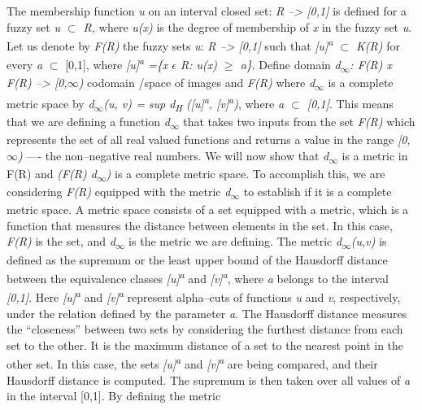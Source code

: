 \documentclass[12pt,a4paper]{report}
\numberwithin{equation}{section}
\begin{document}
The membership function \emph{u} on an interval closed set: \emph{R
--\textgreater{} {[}0,1{]}} is defined for a fuzzy set \emph{u $\subset$ R,}
where \emph{u(x)} is the degree of membership of \emph{x} in the fuzzy
set \emph{u}. Let us denote by \emph{F(R)} the fuzzy sets \emph{u}:
\emph{R --\textgreater{} {[}0,1{]}} such that
\emph{{[}u{]}\textsuperscript{a} $\subset$ K(R)} for every \emph{a} $\subset$ {[}0,1{]},
where \emph{{[}u{]}\textsuperscript{a} =\{x $\epsilon$ R: u(x) $\geq$ a\}}. Define
domain \emph{d\textsubscript{$\infty$}: F(R) x F(R) --\textgreater{} {[}0,$\infty$)}
codomain /space of images and \emph{F(R)} where
\emph{d\textsubscript{$\infty$}} is a complete metric space by
\emph{d\textsubscript{$\infty$}(u, v) = sup d\textsubscript{H}
({[}u{]}\textsuperscript{a}, {[}v{]}\textsuperscript{a})}, where \emph{a
$\subset$ {[}0,1{]}}. This means that we are defining a function
\emph{d\textsubscript{$\infty$}} that takes two inputs from the set \emph{F(R)}
which represents the set of all real valued functions and returns a
value in the range \emph{{[}0, $\infty$)} ---- the non--negative real numbers. We
will now show that \emph{d\textsubscript{$\infty$}} is a metric in F(R) and
\emph{(F(R) d\textsubscript{$\infty$})} is a complete metric space. To
accomplish this, we are considering \emph{F(R)} equipped with the metric
\emph{d\textsubscript{$\infty$}} to establish if it is a complete metric space.
A metric space consists of a set equipped with a metric, which is a
function that measures the distance between elements in the set. In this
case, \emph{F(R)} is the set, and \emph{d\textsubscript{$\infty$}} is the
metric we are defining. The metric \emph{d\textsubscript{$\infty$}(u,v)} is
defined as the supremum or the least upper bound of the Hausdorff
distance between the equivalence classes
\emph{{[}u{]}\textsuperscript{a}} and \emph{{[}v{]}\textsuperscript{a}},
where \emph{a} belongs to the interval \emph{{[}0,1{]}}. Here
\emph{{[}u{]}\textsuperscript{a}} and \emph{{[}v{]}\textsuperscript{a}}
represent alpha--cuts of functions \emph{u} and
\emph{v}, respectively, under the relation defined by the parameter
\emph{a}. The Hausdorff distance measures the ``closeness'' between two
sets by considering the furthest distance from each set to the other. It
is the maximum distance of a set to the nearest point in the other set.
In this case, the sets \emph{{[}u{]}\textsuperscript{a}} and
\emph{{[}v{]}\textsuperscript{a}} are being compared, and their
Hausdorff distance is computed. The supremum is then taken over all
values of \emph{a} in the interval {[}0,1{]}. By defining the metric
\end{document}
